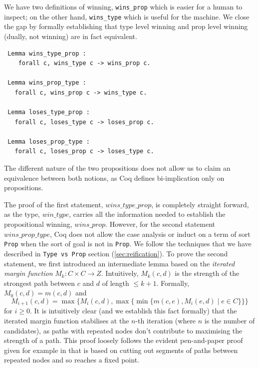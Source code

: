\noindent
We have two definitions of winning, \texttt{wins\_prop} which is easier for a human to inspect; 
on the other hand, \texttt{wins\_type} which is useful for the machine. 
We close the gap by formally establishing that type level winning and prop level winning 
(dually, not winning) are in fact equivalent. 

\begin{verbatim}
 Lemma wins_type_prop : 
    forall c, wins_type c -> wins_prop c.

 Lemma wins_prop_type : 
   forall c, wins_prop c -> wins_type c.
 
 Lemma loses_type_prop : 
   forall c, loses_type c -> loses_prop c.
 
 Lemma loses_prop_type : 
   forall c, loses_prop c -> loses_type c.
\end{verbatim}

\noindent
The different nature of the two propositions does not allow
us to claim an equivalence between both notions, as Coq defines
bi-implication only on propositions.

The proof of the first statement, $wins\_type\_prop$, is completely straight forward, as
the type, $win\_type$, carries all the information needed to establish the
propositional winning, $wins\_prop$. However, for the second statement 
$wins\_prop\_type$, Coq does not allow the 
case analysis or induct on a term of sort \texttt{Prop} when the sort of goal 
is not in \texttt{Prop}. We follow the techniques that we have described in 
\texttt{Type vs Prop} section (\ref{sec:reification}).
%
\noindent
To prove the second statement, we first introduced an 
intermediate lemma based on the \emph{iterated margin
function}
$M_k: C \times C \to Z$. Intuitively, $M_k (c, d)$ is the
strength of the strongest path between $c$ and $d$ of length $\leq
k+1$. Formally,
$M_0 (c, d) = m(c, d)$ and
\[ M_{i+1}(c, d) = \max \lbrace M_i(c, d), \max \lbrace  \min
\lbrace m(c, e), M_i(e, d) \mid e \in C \rbrace \rbrace \rbrace
\] for $i \geq 0$. 
It is intuitively clear (and we establish this fact formally) that
the iterated margin function stabilises at the $n$-th iteration
(where $n$ is the number of candidates), as paths with repeated
nodes don't contribute to maximising the strength of a path. This
proof loosely follows the evident pen-and-paper proof given for
example in
\citep{Carre:1971:ANR} that is based on cutting out segments of paths
between repeated nodes and so reaches a fixed point.

